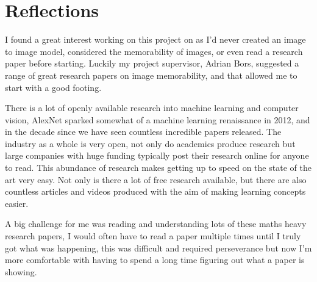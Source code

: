 \documentclass{UoYCSproject}
\begin{document}


\chapter{Reflections}









I found a great interest working on this project on as I'd never created an image to image model, considered the memorability of images, or even read a research paper before starting. Luckily my project supervisor, Adrian Bors, suggested a range of great research papers on image memorability, and that allowed me to start with a good footing.

There is a lot of openly available research into machine learning and computer vision, AlexNet \cite{alexnet} sparked somewhat of a machine learning renaissance in 2012, and in the decade since we have seen countless incredible papers released. The industry as a whole is very open, not only do academics produce research but large companies with huge funding typically post their research online for anyone to read. This abundance of research makes getting up to speed on the state of the art very easy. Not only is there a lot of free research available, but there are also countless articles and videos produced with the aim of making learning concepts easier. 

A big challenge for me was reading and understanding lots of these maths heavy research papers, I would often have to read a paper multiple times until I truly got what was happening, this was difficult and required perseverance but now I'm more comfortable with having to spend a long time figuring out what a paper is showing.
\end{document}
